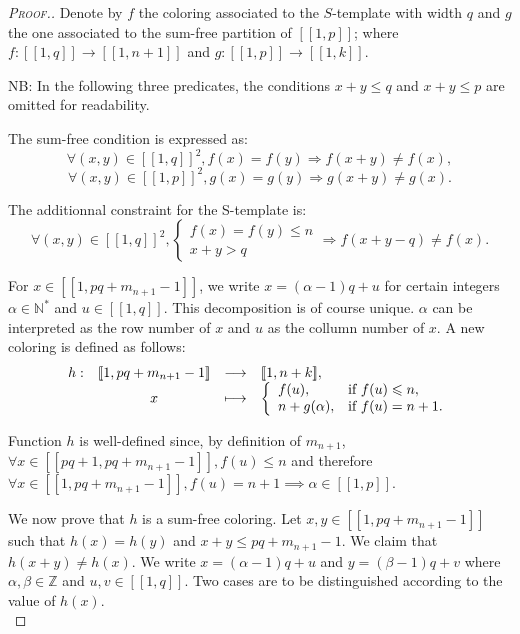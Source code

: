\begin{proof}[\textsc{Proof.}]
	Denote by \(f\) the coloring associated to the \(S\)-template with width \(q\) and \(g\) the one associated 
	to the sum-free partition of \([\![1,p]\!]\); where \(f : [\![1,q]\!] \longrightarrow [\![1,n+1]\!]\) and 
	\(g : [\![1,p]\!] \longrightarrow [\![1,k]\!]\).
	
	\par
	NB: In the following three predicates, the conditions \(x + y \leqslant q\)  and \(x + y \leqslant p\) are omitted for readability.
	\par
	The sum-free condition is expressed as:
	\[\forall (x,y) \in [\![1,q]\!]^2, f(x) = f(y) \Longrightarrow f(x+y) \neq f(x),\]
	\[\forall (x,y) \in [\![1,p]\!]^2, g(x) = g(y) \Longrightarrow g(x+y) \neq g(x).\]
	
	The additionnal constraint for the S-template is:
	\[
	\forall (x,y) \in [\![1,q]\!]^2, \left\{
	\begin{array}{l}
		f(x) = f(y) \leqslant n \\
		x + y > q
	\end{array}
	\right. \Longrightarrow f(x+y-q) \neq f(x).
	\]
	
	For \(x \in [\![1,pq+m_{n+1}-1]\!]\), we write \(x = (\alpha - 1) q + u\) for certain integers \(\alpha \in \mathbb{N}^*\) and 
	\(u \in [\![1,q]\!]\). This decomposition is of course unique. \(\alpha\)  can be interpreted as the row number of \(x\) and 
	\(u\) as the collumn number of \(x\). A new coloring is defined as follows:
	\[
	\begin{array}{c c c l}
		h : & [\![1,pq+m_{n+1}-1]\!] & \longrightarrow & [\![1,n+k]\!], \\
		& x & \longmapsto & 
		\left\{ \begin{array}{l l}
			f(u), & \text{if}~f(u) \leqslant n, \\
			n + g(\alpha), & \text{if}~f(u) = n + 1. \\
		\end{array} \right.
	\end{array}
	\]
	
	Function \(h\) is well-defined since, by definition of \(m_{n+1}\), \(\forall x \in [\![p q + 1, p q + m_{n + 1} - 1 ]\!], f(u) 
	\leqslant n\) and therefore \(\forall x \in [\![1,pq+m_{n+1}-1]\!], f(u) = n + 1 \implies \alpha \in [\![1, p]\!]\).
	
	\par
	We now prove that \(h\) is a sum-free coloring. Let \(x,y \in [\![1,pq + m_{n+1}-1]\!]\) such that \(h(x) = h(y)\) 
	and \(x+y \leqslant pq+m_{n+1}-1\). We claim that \(h(x+y) \neq h(x)\). We write \(x = (\alpha - 1) q + u\) and 
	\(y = (\beta - 1) q + v\) where \(\alpha, \beta \in \mathbb{Z}\) and \(u, v \in [\![1,q]\!]\). Two cases are to be
	distinguished according to the value of \(h(x)\). \\
	

\end{proof}
